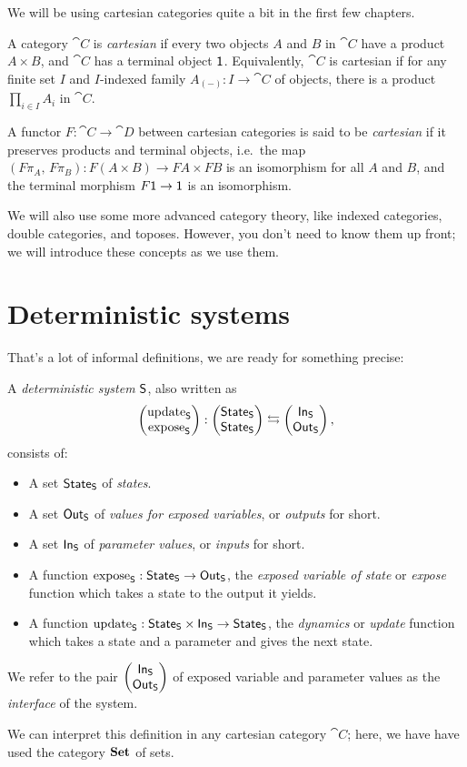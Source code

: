 \documentclass[DynamicalBook]{subfiles}
\begin{document}
We will be using cartesian categories quite a bit in the first few chapters.
\begin{definition}\label{def.cartesian_category}
  A category $\cat{C}$ is \emph{cartesian} if every two objects $A$ and $B$ in
  $\cat{C}$ have a product $A \times B$, and $\cat{C}$ has a terminal object
  $\mathsf{1}$. Equivalently, $\cat{C}$ is cartesian if for any finite set $I$ and
  $I$-indexed family $A_{(-)} : I \to \cat{C}$ of objects, there is a product
  $\prod_{i \in I} A_i$ in $\cat{C}$.

  A functor $F : \cat{C} \to \cat{D}$ between cartesian categories is said to be
  \emph{cartesian} if it preserves products and terminal objects, i.e.\ the
  map $(F\pi_A,\, F\pi_B) : F(A \times B) \to FA \times FB$ is an isomorphism
  for all $A$ and $B$, and the terminal morphism $F\mathsf{1} \to \mathsf{1}$ is an
  isomorphism. 
\end{definition}

We will also use some more advanced category theory, like indexed
categories, double categories, and toposes. However, you don't need to know them up front; we will introduce these concepts
as we use them.

\section{Deterministic systems}

That's a lot of informal definitions, we are ready for something precise:
\begin{definition}\label{def.deterministic_system}
  A \emph{deterministic system} $\mathsf{S}$, also written as $$\begin{pmatrix}{\mathrm{update}_{\mathsf{S}}} \\ {\mathrm{expose}_{\mathsf{S}}} \end{pmatrix} : \begin{pmatrix}{\mathsf{State}_{\mathsf{S}}} \\ {\mathsf{State}_{\mathsf{S}}} \end{pmatrix} \leftrightarrows \begin{pmatrix}{\mathsf{In}_{\mathsf{S}}} \\ {\mathsf{Out}_{\mathsf{S}}} \end{pmatrix},$$ consists of:
  \begin{itemize}
    \item A set $\mathsf{State}_{\mathsf{S}}$ of \emph{states}.
    \item A set $\mathsf{Out}_{\mathsf{S}}$ of \emph{values for exposed variables}, or \emph{outputs}
      for short.
    \item A set $\mathsf{In}_{\mathsf{S}}$ of \emph{parameter values}, or \emph{inputs} for short.
    \item A function $\mathrm{expose}_{\mathsf{S}} : \mathsf{State}_{\mathsf{S}} \to \mathsf{Out}_{\mathsf{S}}$, the \emph{exposed variable of state} or
      \emph{expose} function which takes a state to the output it yields. 
    \item A function $\mathrm{update}_{\mathsf{S}} : \mathsf{State}_{\mathsf{S}} \times \mathsf{In}_{\mathsf{S}} \to \mathsf{State}_{\mathsf{S}}$, the \emph{dynamics} or
      \emph{update} function which takes a state and a parameter and gives the
      next state.
  \end{itemize}
  We refer to the pair $\begin{pmatrix}{\mathsf{In}_{\mathsf{S}}} \\ {\mathsf{Out}_{\mathsf{S}}} \end{pmatrix}$ of exposed variable and parameter values as
  the \emph{interface} of the system.

We can interpret this definition in any cartesian category $\cat{C}$; here, we
have have used the category $\textbf{Set}$ of sets.
\end{definition}
\end{document}
